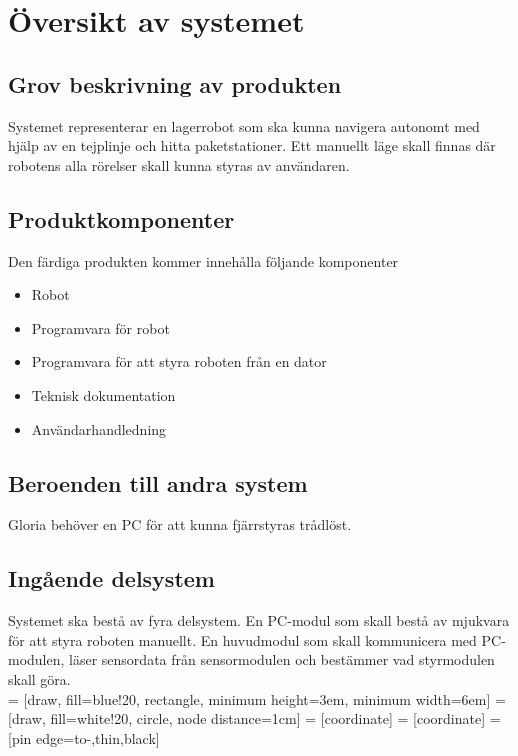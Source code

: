 \section{Översikt av systemet}

\subsection{Grov beskrivning av produkten}
Systemet representerar en lagerrobot som ska kunna navigera autonomt med hjälp av en tejplinje och hitta paketstationer. Ett manuellt läge skall finnas där robotens alla rörelser skall kunna styras av användaren.

\subsection{Produktkomponenter}
Den färdiga produkten kommer innehålla följande komponenter
\begin{itemize}
\item{Robot}
\item{Programvara för robot}
\item{Programvara för att styra roboten från en dator}
\item{Teknisk dokumentation}
\item{Användarhandledning}
\end{itemize}

\subsection{Beroenden till andra system}
Gloria behöver en PC för att kunna fjärrstyras trådlöst.

\subsection{Ingående delsystem}
Systemet ska bestå av fyra delsystem. En PC-modul som skall bestå av mjukvara för att styra roboten manuellt. En huvudmodul som skall kommunicera med PC-modulen, läser sensordata från sensormodulen och bestämmer vad styrmodulen skall göra. \\

 = [draw, fill=blue!20, rectangle, 
    minimum height=3em, minimum width=6em]
 = [draw, fill=white!20, circle, node distance=1cm]
 = [coordinate]
 = [coordinate]
 = [pin edge={to-,thin,black}]

\begin{center}
\end{center}

